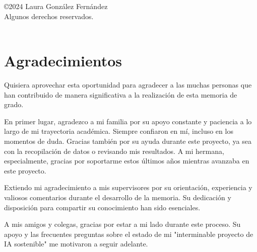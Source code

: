 \documentclass[a4paper, 12pt, oneside]{book}
\begin{document}
\chapter*{}
\thispagestyle{empty}

\begin{flushright}
\begin{minipage}{8cm}
\raggedleft
©2024 Laura González Fernández  \\
Algunos derechos reservados. \\
\doclicenseLongText \\
\vspace{0.5cm}
\doclicenseImage
\end{minipage}

\end{flushright}


\chapter*{Agradecimientos}
\thispagestyle{empty}

Quisiera aprovechar esta oportunidad para agradecer a las muchas personas que han contribuido de manera significativa a la realización de esta memoria de grado.

En primer lugar, agradezco a mi familia por su apoyo constante y paciencia a lo largo de mi trayectoria académica. Siempre confiaron en mí, incluso en los momentos de duda. Gracias también por su ayuda durante este proyecto, ya sea con la recopilación de datos o revisando mis resultados. A mi hermana, especialmente, gracias por soportarme estos últimos años mientras avanzaba en este proyecto.

Extiendo mi agradecimiento a mis supervisores por su orientación, experiencia y valiosos comentarios durante el desarrollo de la memoria. Su dedicación y disposición para compartir su conocimiento han sido esenciales.

A mis amigos y colegas, gracias por estar a mi lado durante este proceso. Su apoyo y las frecuentes preguntas sobre el estado de mi "interminable proyecto de IA sostenible" me motivaron a seguir adelante.
\end{document}
